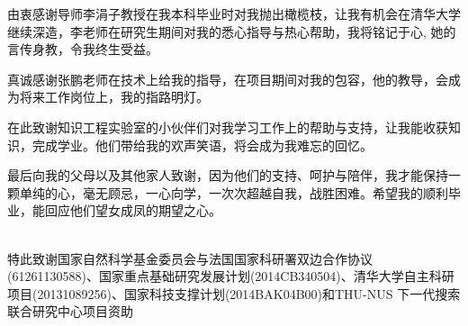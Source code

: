 \begin{acknowledgement}
  由衷感谢导师李涓子教授在我本科毕业时对我抛出橄榄枝，让我有机会在清华大学继续深造，李老师在研究生期间对我的悉心指导与热心帮助，我将铭记于心, 她的言传身教，令我终生受益。

  真诚感谢张鹏老师在技术上给我的指导，在项目期间对我的包容，他的教导，会成为将来工作岗位上，我的指路明灯。

  在此致谢知识工程实验室的小伙伴们对我学习工作上的帮助与支持，让我能收获知识，完成学业。他们带给我的欢声笑语，将会成为我难忘的回忆。

  最后向我的父母以及其他家人致谢，因为他们的支持、呵护与陪伴，我才能保持一颗单纯的心，毫无顾忌，一心向学，一次次超越自我，战胜困难。希望我的顺利毕业，能回应他们望女成凤的期望之心。

~\\

  特此致谢国家自然科学基金委员会与法国国家科研署双边合作协议(61261130588)、国家重点基础研究发展计划(2014CB340504)、清华大学自主科研项目(20131089256)、国家科技支撑计划(2014BAK04B00)和THU-NUS 下一代搜索联合研究中心项目资助

\end{acknowledgement}
